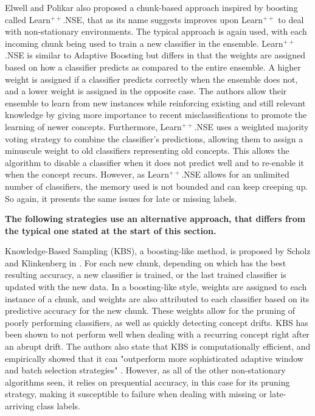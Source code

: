 Elwell and Polikar also proposed a chunk-based approach inspired by boosting called \cite{elwell2011incremental} Learn$^{++}$.NSE, that as its name suggests improves upon Learn$^{++}$ to deal with non-stationary environments. The typical approach is again used, with each incoming chunk being used to train a new classifier in the ensemble. Learn$^{++}$.NSE is similar to Adaptive Boosting but differs in that the weights are assigned based on how a classifier predicts as compared to the entire ensemble. A higher weight is assigned if a classifier predicts correctly when the ensemble does not, and a lower weight is assigned in the opposite case. The authors allow their ensemble to learn from new instances while reinforcing existing and still relevant knowledge by giving more importance to recent misclassifications to promote the learning of newer concepts. Furthermore, Learn$^{++}$.NSE uses a weighted majority voting strategy to combine the classifier's predictions, allowing them to assign a minuscule weight to old classifiers representing old concepts. This allows the algorithm to disable a classifier when it does not predict well and to re-enable it when the concept recurs. However, as Learn$^{++}$.NSE allows for an unlimited number of classifiers, the memory used is not bounded and can keep creeping up. So again, it presents the same issues for late or missing labels.


\textbf{The following strategies use an alternative approach, that differs from the typical one stated at the start of this section.}

Knowledge-Based Sampling (KBS), a boosting-like method, is proposed by Scholz and Klinkenberg in \cite{scholz2005ensemble}. For each new chunk, depending on which has the best resulting accuracy, a new classifier is trained, or the last trained classifier is updated with the new data. In a boosting-like style, weights are assigned to each instance of a chunk, and weights are also attributed to each classifier based on its predictive accuracy for the new chunk. These weights allow for the pruning of poorly performing classifiers, as well as quickly detecting concept drifts. KBS has been shown to not perform well when dealing with a recurring concept right after an abrupt drift. The authors also state that KBS is computationally efficient, and empirically showed that it can "outperform more sophisticated adaptive window and batch selection strategies" \cite{scholz2005ensemble}. However, as all of the other non-stationary algorithms seen, it relies on prequential accuracy, in this case for its pruning strategy, making it susceptible to failure when dealing with missing or late-arriving class labels.

